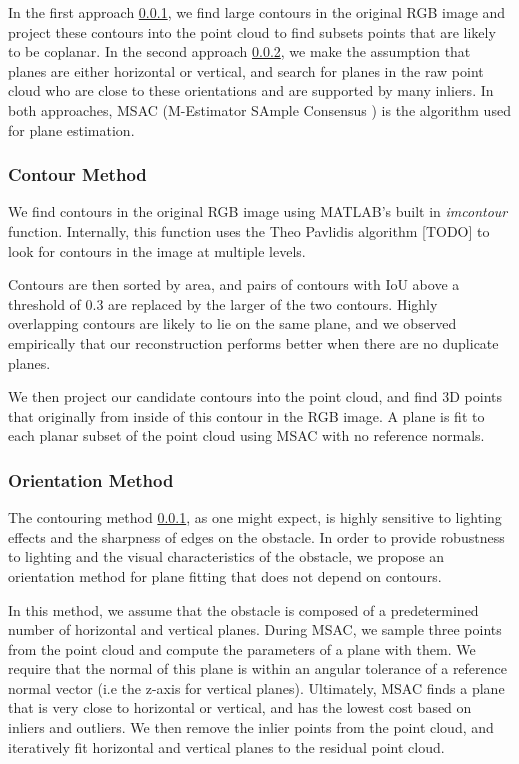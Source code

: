 In the first approach \ref{contour-method}, we find large contours in the original RGB image and project these contours into the point cloud to find subsets points that are likely to be coplanar. In the second approach \ref{orient-method}, we make the assumption that planes are either horizontal or vertical, and search for planes in the raw point cloud who are close to these orientations and are supported by many inliers. In both approaches, MSAC (M-Estimator SAmple Consensus \cite{msac-article}) is the algorithm used for plane estimation.

\subsubsection{Contour Method} \label{contour-method}

We find contours in the original RGB image using MATLAB's built in \textit{imcontour} function. Internally, this function uses the Theo Pavlidis algorithm [TODO] to look for contours in the image at multiple levels.

Contours are then sorted by area, and pairs of contours with IoU above a threshold of 0.3 are replaced by the larger of the two contours. Highly overlapping contours are likely to lie on the same plane, and we observed empirically that our reconstruction performs better when there are no duplicate planes.

We then project our candidate contours into the point cloud, and find 3D points that originally from inside of this contour in the RGB image. A plane is fit to each planar subset of the point cloud using MSAC with no reference normals.

\subsubsection{Orientation Method} \label{orient-method}

The contouring method \ref{contour-method}, as one might expect, is highly sensitive to lighting effects and the sharpness of edges on the obstacle. In order to provide robustness to lighting and the visual characteristics of the obstacle, we propose an orientation method for plane fitting that does not depend on contours.

In this method, we assume that the obstacle is composed of a predetermined number of horizontal and vertical planes. During MSAC, we sample three points from the point cloud and compute the parameters of a plane with them. We require that the normal of this plane is within an angular tolerance of a reference normal vector (i.e the z-axis for vertical planes). Ultimately, MSAC finds a plane that is very close to horizontal or vertical, and has the lowest cost based on inliers and outliers. We then remove the inlier points from the point cloud, and iteratively fit horizontal and vertical planes to the residual point cloud.

